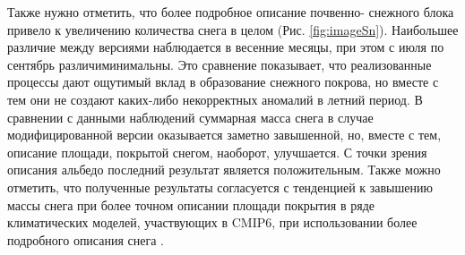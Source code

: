 \documentclass[a4paper, fontsize=14pt]{scrartcl}
\begin{document}
Также нужно отметить, что более подробное описание почвенно- снежного блока привело к увеличению количества снега в целом (Рис. \ref{fig:imageSn}). Наибольшее различие между версиями наблюдается в весенние месяцы, при этом с июля по сентябрь различиминимальны. Это сравнение показывает, что реализованные процессы дают ощутимый вклад в образование снежного покрова, но вместе с тем они не создают каких-либо некорректных аномалий в летний период.  В сравнении с данными наблюдений суммарная масса снега в случае модифицированной версии оказывается заметно завышенной, но, вместе с тем, описание площади, покрытой снегом, наоборот, улучшается. С точки зрения описания альбедо последний результат является положительным. Также можно отметить, что полученные результаты  согласуется с тенденцией к завышению массы снега при более точном описании площади покрытия в ряде климатических моделей, участвующих в CMIP6, при использовании более подробного описания снега \cite{Mudryk2020}.
\end{document}
